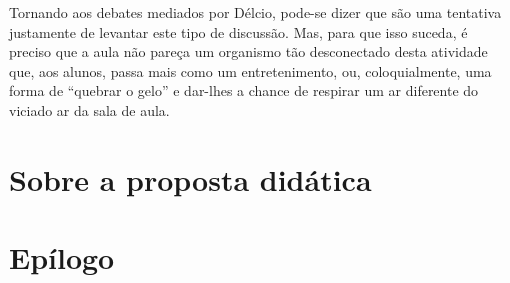 \documentclass[12pt,a4paper]{article}
\begin{document}
	Tornando aos debates mediados por Délcio, pode-se dizer que são uma 
	tentativa justamente de levantar este tipo de discussão. Mas, para que 
	isso suceda, é preciso que a aula não pareça um organismo tão desconectado 
	desta atividade que, aos alunos, passa mais como um entretenimento, ou, 
	coloquialmente, uma forma de ``quebrar o gelo'' e dar-lhes a chance de 
	respirar um ar diferente do viciado ar da sala de aula. 
	
	
	
	\newpage
	
	\section{Sobre a proposta didática}
	
	\newpage
	
	\section{Epílogo}
	
    
	
\end{document}
